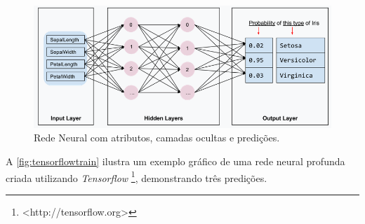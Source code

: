 \begin{figure}[ht]
	\caption{\label{fig:tensorflowtrain}Rede Neural com atributos, camadas ocultas e predições.}
	\begin{center}
	    \includegraphics[width=\textwidth]{resources/tensorflowtrain}
	\end{center}
\end{figure}

A \autoref{fig:tensorflowtrain} ilustra um exemplo gráfico de uma rede neural profunda criada utilizando  \textit{Tensorflow} \footnote{<http://tensorflow.org>}, demonstrando três predições.









